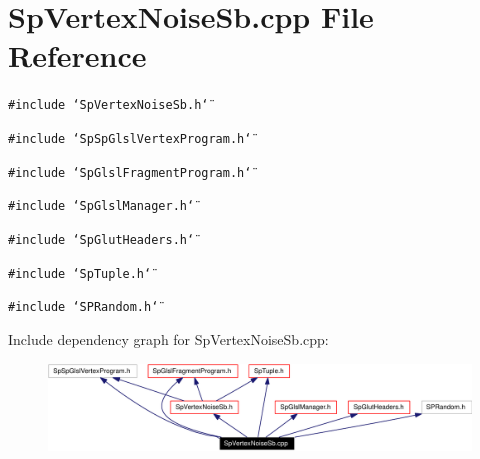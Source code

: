 \section{Sp\-Vertex\-Noise\-Sb.cpp File Reference}
\label{SpVertexNoiseSb_8cpp}
{\tt \#include \char`\"{}Sp\-Vertex\-Noise\-Sb.h\char`\"{}}\par
{\tt \#include \char`\"{}Sp\-Sp\-Glsl\-Vertex\-Program.h\char`\"{}}\par
{\tt \#include \char`\"{}Sp\-Glsl\-Fragment\-Program.h\char`\"{}}\par
{\tt \#include \char`\"{}Sp\-Glsl\-Manager.h\char`\"{}}\par
{\tt \#include \char`\"{}Sp\-Glut\-Headers.h\char`\"{}}\par
{\tt \#include \char`\"{}Sp\-Tuple.h\char`\"{}}\par
{\tt \#include \char`\"{}SPRandom.h\char`\"{}}\par


Include dependency graph for Sp\-Vertex\-Noise\-Sb.cpp:\begin{figure}[H]
\begin{center}
\leavevmode
\includegraphics[width=341pt]{SpVertexNoiseSb_8cpp__incl}
\end{center}
\end{figure}
